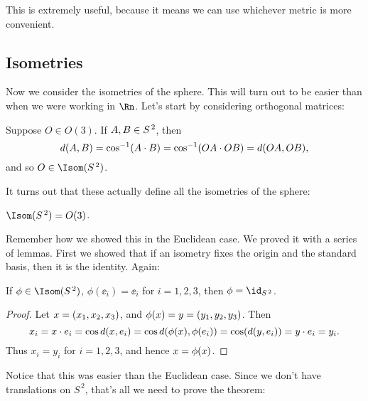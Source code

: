 This is extremely useful, because it means we can use whichever metric is more convenient.


\subsection{Isometries} %
\label{sub:spherical_isometries}

Now we consider the isometries of the sphere. This will turn out to be easier than when we were working in $\Rn$. Let's start by considering orthogonal matrices:

\begin{example}
	Suppose $O\in O(3)$. If $A,B\in S^{\,2}$, then
	\begin{equation*}
		d(A,B) = \cos^{-1} (A\cdot B) = \cos^{-1}(OA \cdot OB) = d(OA, OB),
	\end{equation*}
	and so $O\in\Isom(S^{\,2})$. %
\end{example}

It turns out that these actually define all the isometries of the sphere:

\begin{theorem}
	$\Isom(S^{\,2}) = O(3)$. %
\end{theorem}

Remember how we showed this in the Euclidean case. We proved it with a series of lemmas. First we showed that if an isometry fixes the origin and the standard basis, then it is the identity. Again:

\begin{lemma}
	If $\phi\in\Isom(S^{\,2})$, $\phi(\ee_i) = \ee_i$ for $i=1,2,3$, then $\phi=\id_{S^{\,2}}$. %
\end{lemma}

\begin{proof}
	Let $x=(x_1,x_2,x_3)$, and $\phi(x)=y=(y_1,y_2,y_3)$. Then
	\begin{equation*}
		x_i
		= x\cdot e_i
		= \cos d(x,e_i)
		= \cos d(\phi(x), \phi(e_i)) = \cos(d(y,e_i))
		= y\cdot e_i = y_i.
	\end{equation*}
	Thus $x_i=y_i$ for $i=1,2,3$, and hence $x=\phi(x)$. %
\end{proof}

	\pagebreak

Notice that this was easier than the Euclidean case. Since we don't have translations on $S^{\,2}$, that's all we need to prove the theorem:

